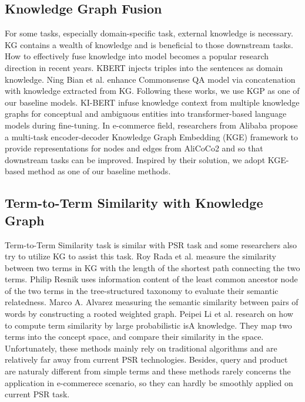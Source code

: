 \subsection{Knowledge Graph Fusion} 
For some tasks, especially domain-specific task, external knowledge is necessary. KG contains a wealth of knowledge and is beneficial to those downstream tasks. How to effectively fuse knowledge into model becomes a popular research direction in recent years. KBERT \cite{weijie2019kbert} injects triples into the sentences as domain knowledge. Ning Bian et al. \cite{bian2021benchmarking} enhance Commonsense QA model via concatenation with knowledge extracted from KG. Following these works, we use KGP as one of our baseline models. KI-BERT \cite{faldu2021ki} infuse knowledge context from multiple knowledge graphs for conceptual and ambiguous entities into transformer-based language models during fine-tuning. In e-commerce field, researchers from Alibaba \cite{luo2021alicoco2} propose a multi-task encoder-decoder Knowledge Graph Embedding (KGE) framework to provide representations for nodes and edges from AliCoCo2 and so that downstream tasks can be improved. Inspired by their solution, we adopt KGE-based method as one of our baseline methods.

\subsection{Term-to-Term Similarity with Knowledge Graph} 
Term-to-Term Similarity task is similar with PSR task and some researchers also try to utilize KG to assist this task. Roy Rada et al. \cite{rada1989development} measure the similarity between two terms in KG with the length of the shortest path connecting the two terms. Philip Resnik \cite{resnik1995using} uses information content of the least common ancestor node of the two terms in the tree-structured taxonomy to evaluate their semantic relatedness. Marco A. Alvarez \cite{alvarez2007graph} measuring the semantic similarity between pairs of words by constructing a rooted weighted graph. Peipei Li et al. \cite{li2013computing} research on how to compute term similarity by large probabilistic isA knowledge. They map two terms into the concept space, and compare their similarity in the space. Unfortunately, these methods mainly rely on traditional algorithms and are relatively far away from current PSR technologies. Besides, query and product are naturaly different from simple terms and these methods rarely concerns the application in e-commerece scenario, so they can hardly be smoothly applied on current PSR task. 


